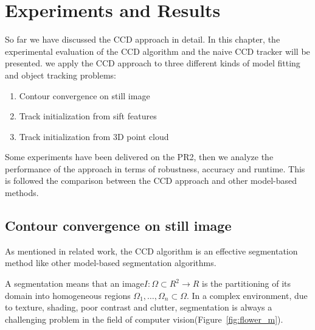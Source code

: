 \chapter{Experiments and Results}
\label{chapter:experiments}

So far we have discussed the CCD approach in detail. In this chapter,
the experimental evaluation of the CCD algorithm and the naive CCD
tracker will be presented. we apply the CCD approach to three
different kinds of model fitting and object tracking problems:

\begin{enumerate}
\item Contour convergence on still image
\item Track initialization from sift features
\item Track initialization from 3D point cloud
\end{enumerate}

Some experiments have been delivered on the PR2, then we analyze the performance
of the approach in terms of robustness, accuracy and runtime. This is
followed the comparison between the CCD approach and  other
model-based methods.



\section{Contour convergence on still image}
\label{sec:ES}

As mentioned in related work, the CCD algorithm is an effective
segmentation method like other model-based segmentation algorithms.

A segmentation means that an image$I: \Omega \subset R^2 \longrightarrow R$
is the partitioning of its domain into homogeneous regions
$\Omega_1,\ldots, \Omega_n \subset \Omega$. In a complex environment,
due to texture, shading, poor contrast and clutter, segmentation is
always a challenging problem in the field of computer
vision(Figure~\ref{fig:flower_m}).

